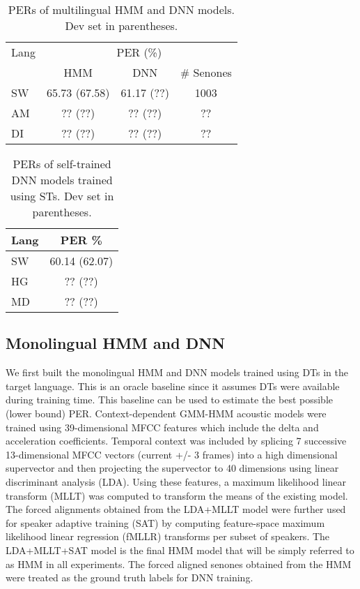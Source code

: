 \documentclass[a4paper]{article}
\begin{document}
\begin{table}
\centering %
\caption{PERs of multilingual HMM and DNN models. Dev set in parentheses.}
\begin{tabular}{l|c c c}
   \hline
Lang  & \multicolumn{3}{c}{PER (\%)} \\
          &  HMM & DNN & \# Senones   \\ \hline
SW      &65.73 (67.58)   &61.17 (??) & 1003 \\
AM      &?? (??)   &?? (??) &  ?? \\ 
DI     &?? (??)   &?? (??) & ??  \\ \hline
\end{tabular}
\vspace{-7mm}
\label{Tab:PER_Mismatched_Multilingual}
\end{table}

\begin{table}
\centering %
\caption{PERs of self-trained DNN models trained using STs. Dev set in parentheses.}
\begin{tabular}{l|c }
   \hline
Lang  & \multicolumn{1}{c}{PER \%} \\ \hline
SW   &  60.14 (62.07)  \\
HG   &  ?? (??) \\
MD   &  ?? (??)  \\ \hline
\end{tabular}
\vspace{-8mm}
\label{Tab:PER_ASRPT_DNN_monosoftmax}
\end{table}


\subsection{Monolingual HMM and DNN}
\label{sec:Monolingual HMM and DNN}
We first built the monolingual HMM and DNN models trained using DTs in the target language. This is an oracle baseline since it assumes DTs were available during training time. This baseline can be used to estimate the best possible (lower bound) PER.
Context-dependent GMM-HMM acoustic models were trained using 39-dimensional MFCC features which include the delta and acceleration coefficients. Temporal context was included by splicing 7 successive 13-dimensional MFCC vectors (current +/- 3 frames) into a high dimensional supervector and then projecting the supervector to 40 dimensions using linear discriminant analysis (LDA). Using these features, a maximum likelihood linear transform (MLLT) \cite{Gopinath-MLLT} was computed to transform the means of the existing model. The forced alignments obtained from the LDA+MLLT model were further used for speaker adaptive training (SAT) by computing feature-space maximum likelihood linear regression (fMLLR) transforms \cite{Gales-CMLLR} per subset of speakers. The LDA+MLLT+SAT model is the final HMM model that will be simply referred to as HMM in all experiments. The forced aligned senones obtained from the HMM were treated as the ground truth labels for DNN training. 
\end{document}
